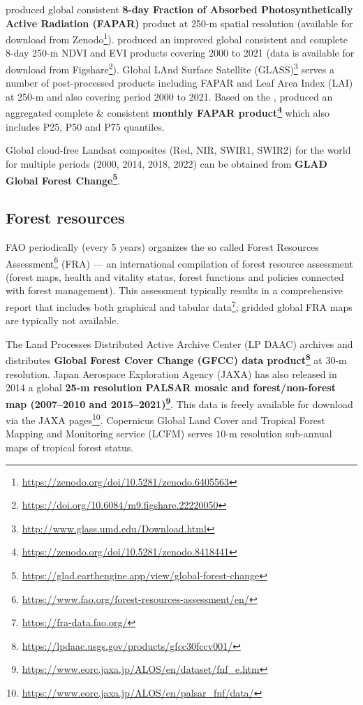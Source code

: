\documentclass[
  graybox,natbib,nospthms]{svmono}
\renewcommand{\href}[2]{#2 (\url{#1})}
\renewcommand{\href}[2]{#2\footnote{\url{#1}}}
\begin{document}
\citet{ma2022global} produced global consistent \textbf{8-day Fraction of Absorbed Photosynthetically Active Radiation (FAPAR)}
product at 250-m spatial resolution (available for download from \href{https://zenodo.org/doi/10.5281/zenodo.6405563}{Zenodo}).
\citet{xiong2023improved} produced an improved global consistent and complete 8-day 250-m NDVI and EVI products
covering 2000 to 2021 (data is available for download from \href{https://doi.org/10.6084/m9.figshare.22220050}{Figshare}).
\href{http://www.glass.umd.edu/Download.html}{Global LAnd Surface Satellite (GLASS)} serves a number of post-processed products
including FAPAR and Leaf Area Index (LAI) at 250-m and also covering period 2000 to 2021.
Based on the \citet{ma2022global}, \citet{Hacklaender2024PeerJ} produced an aggregated
complete \& consistent \textbf{\href{https://zenodo.org/doi/10.5281/zenodo.8418441}{monthly FAPAR product}} which also includes P25, P50 and P75 quantiles.

Global cloud-free Landsat composites (Red, NIR, SWIR1, SWIR2) for the world for multiple periods (2000, 2014, 2018, 2022) can be obtained from \textbf{\href{https://glad.earthengine.app/view/global-forest-change}{GLAD Global Forest Change}}.

\hypertarget{forest-resources}{%
\subsection{Forest resources}\label{forest-resources}}

FAO periodically (every 5 years) organizes the so called \href{https://www.fao.org/forest-resources-assessment/en/}{Forest Resources Assessment} (FRA) ---
an international compilation of forest resource assessment (forest maps, health
and vitality status, forest functions and policies connected with forest management).
This assessment typically results in a comprehensive report that includes both graphical
and \href{https://fra-data.fao.org/}{tabular data}; gridded global FRA maps are typically not available.

The Land Processes Distributed Active Archive Center (LP DAAC) archives and distributes
\textbf{\href{https://lpdaac.usgs.gov/products/gfcc30fccv001/}{Global Forest Cover Change (GFCC) data product}} at 30-m resolution.
Japan Aerospace Exploration Agency (JAXA) has also released in 2014 a global
\textbf{\href{https://www.eorc.jaxa.jp/ALOS/en/dataset/fnf_e.htm}{25-m resolution PALSAR mosaic and forest/non-forest map (2007--2010 and 2015--2021)}}. This data is freely available for download via the \href{https://www.eorc.jaxa.jp/ALOS/en/palsar_fnf/data/}{JAXA pages}.
Copernicus Global Land Cover and Tropical Forest Mapping and Monitoring service (LCFM)
serves 10-m resolution sub-annual maps of tropical forest status.
\end{document}
